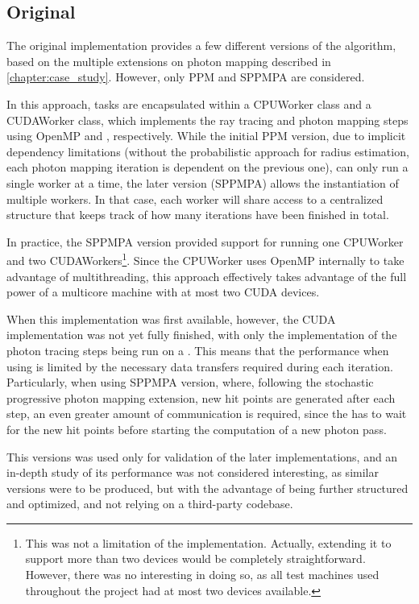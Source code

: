 \documentclass[main.tex]{subfiles}
\begin{document}
\subsection{Original} \label{section:impl_original}

The original implementation provides a few different versions of the algorithm, based on the multiple extensions on photon mapping described in \cref{chapter:case_study}. However, only PPM and SPPMPA are considered.

In this approach, tasks are encapsulated within a CPUWorker class and a CUDAWorker class, which implements the ray tracing and photon mapping steps using \acs{OpenMP} and \cuda, respectively. While the initial PPM version, due to implicit dependency limitations (without the probabilistic approach for radius estimation, each photon mapping iteration is dependent on the previous one), can only run a single worker at a time, the later version (SPPMPA) allows the instantiation of multiple workers. In that case, each worker will share access to a centralized structure that keeps track of how many iterations have been finished in total.

In practice, the SPPMPA version provided support for running one CPUWorker and two CUDAWorkers\footnote{This was not a limitation of the implementation. Actually, extending it to support more than two \cuda devices would be completely straightforward. However, there was no interesting in doing so, as all test machines used throughout the project had at most two \cuda devices available.}. Since the CPUWorker uses \acs{OpenMP} internally to take advantage of multithreading, this approach effectively takes advantage of the full power of a multicore machine with at most two \acs{CUDA} devices.

When this implementation was first available, however, the \acs{CUDA} implementation was not yet fully finished, with only the implementation of the photon tracing steps being run on a \gpu. This means that the performance when using \cuda is limited by the necessary data transfers required during each iteration. Particularly, when using SPPMPA version, where, following the stochastic progressive photon mapping extension, new hit points are generated after each step, an even greater amount of communication is required, since the \gpu has to wait for the new hit points before starting the computation of a new photon pass.

This versions was used only for validation of the later implementations, and an in-depth study of its performance was not considered interesting, as similar versions were to be produced, but with the advantage of being further structured and optimized, and not relying on a third-party codebase.
\end{document}

